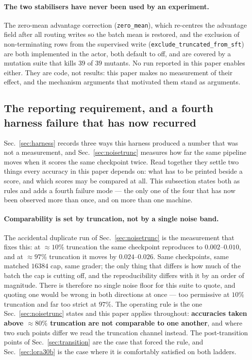 \paragraph{The two stabilisers have never been used by an experiment.} The zero-mean
advantage correction (\texttt{zero\_mean}), which re-centres the advantage field after all
routing writes so the batch mean is restored, and the exclusion of non-terminating rows from
the supervised write (\texttt{exclude\_truncated\_from\_sft}) are both implemented in the
actor, both default to off, and are covered by a mutation suite that kills $39$ of $39$
mutants. No run reported in this paper enables either. They are code, not results: this paper
makes no measurement of their effect, and the mechanism arguments that motivated them stand
as arguments.

\subsection{The reporting requirement, and a fourth harness failure that has now recurred}
\label{sec:reporting}

Sec.~\ref{sec:harness} records three ways this harness produced a number that was not a
measurement, and Sec.~\ref{sec:noisetrunc} measures how far the same pipeline moves when it
scores the same checkpoint twice. Read together they settle two things every accuracy in this
paper depends on: what has to be printed beside a score, and which scores may be compared at
all. This subsection states both as rules and adds a fourth failure mode --- the only one of
the four that has now been observed more than once, and on more than one machine.

\paragraph{Comparability is set by truncation, not by a single noise band.} The accidental
duplicate run of Sec.~\ref{sec:noisetrunc} is the measurement that fixes this: at $\approx
10\%$ truncation the same checkpoint reproduces to $0.002$--$0.010$, and at $\approx 97\%$
truncation it moves by $0.024$--$0.026$. Same checkpoints, same matched $16384$ cap, same
grader; the only thing that differs is how much of the batch the cap is cutting off, and the
reproducibility differs with it by an order of magnitude. There is therefore no single noise
floor for this suite to quote, and quoting one would be wrong in both directions at once ---
too permissive at $10\%$ truncation and far too strict at $97\%$. The operating rule is the
one Sec.~\ref{sec:noisetrunc} states and this paper applies throughout: \textbf{accuracies
taken above $\approx 80\%$ truncation are not comparable to one another}, and where two such
points differ we read the truncation channel instead. The post-transition points of
Sec.~\ref{sec:transition} are the case that forced the rule, and Sec.~\ref{sec:lora30b} is
the case where it is comfortably satisfied on both ladders.

